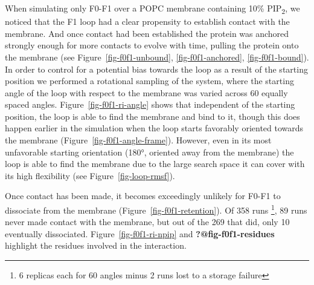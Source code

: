 \documentclass[
  letterpaper,
  DIV=11,
  numbers=noendperiod]{scrartcl}
\begin{document}
When simulating only F0-F1 over a POPC membrane containing 10\%
PIP\textsubscript{2}, we noticed that the F1 loop had a clear propensity
to establish contact with the membrane. And once contact had been
established the protein was anchored strongly enough for more contacts
to evolve with time, pulling the protein onto the membrane (see
Figure~\ref{fig-f0f1-unbound}, \ref{fig-f0f1-anchored}, \ref{fig-f0f1-bound}).
In order to control for a potential bias towards the loop as a result of
the starting position we performed a rotational sampling of the system,
where the starting angle of the loop with respect to the membrane was
varied across 60 equally spaced angles. Figure~\ref{fig-f0f1-ri-angle}
shows that independent of the starting position, the loop is able to
find the membrane and bind to it, though this does happen earlier in the
simulation when the loop starts favorably oriented towards the membrane
(Figure~\ref{fig-f0f1-angle-frame}). However, even in its most
unfavorable starting orientation (180°, oriented away from the membrane)
the loop is able to find the membrane due to the large search space it
can cover with its high flexibility (see Figure~\ref{fig-loop-rmsf}).

Once contact has been made, it becomes exceedingly unlikely for F0-F1 to
dissociate from the membrane (Figure~\ref{fig-f0f1-retention}). Of 358
runs \footnote{6 replicas each for 60 angles minus 2 runs lost to a
  storage failure}, 89 runs never made contact with the membrane, but
out of the 269 that did, only 10 eventually dissociated.
Figure~\ref{fig-f0f1-ri-npip} and \textbf{?@fig-f0f1-residues} highlight
the residues involved in the interaction.
\end{document}

